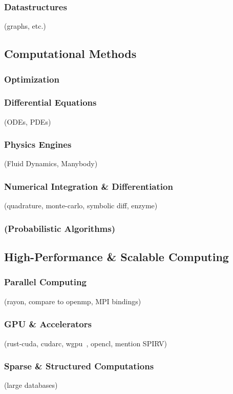 \documentclass{article}
\begin{document}
\subsubsection{Datastructures}
(graphs, etc.)

\subsection{Computational Methods}
\subsubsection{Optimization}
\subsubsection{Differential Equations}
(ODEs, PDEs)

\subsubsection{Physics Engines}
(Fluid Dynamics, Manybody)

\subsubsection{Numerical Integration \& Differentiation}
(quadrature, monte-carlo, symbolic diff, enzyme)

\subsubsection{(Probabilistic Algorithms)}

\subsection{High-Performance \& Scalable Computing}
\subsubsection{Parallel Computing}
(rayon, compare to openmp, MPI bindings)

\subsubsection{GPU \& Accelerators}
(rust-cuda, cudarc, wgpu~\cite{Fitzgerald2025}, opencl, mention SPIRV)

\subsubsection{Sparse \& Structured Computations}
(large databases)
\end{document}
